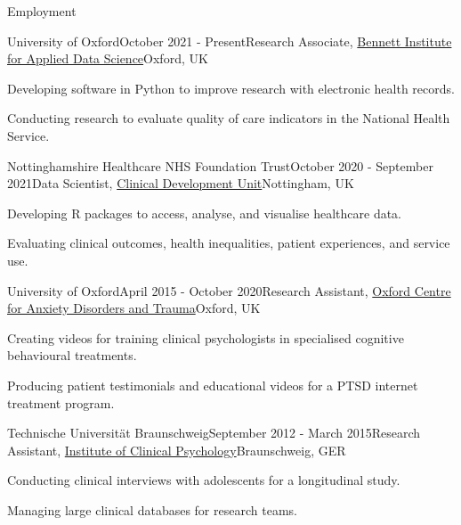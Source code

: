 \documentclass{resume} %
\begin{document}

\begin{rSection}{Employment}

\begin{rSubsection}{University of Oxford}{October 2021 - Present}{Research Associate, \href{https://www.bennett.ox.ac.uk/}{Bennett Institute for Applied Data Science}}{Oxford, UK}
  \item Developing software in Python to improve research with electronic health records.
  \item Conducting research to evaluate quality of care indicators in the National Health Service.
\end{rSubsection}

\begin{rSubsection}{Nottinghamshire Healthcare NHS Foundation Trust}{October 2020 - September 2021}{Data Scientist, \href{https://www.nottinghamshirehealthcare.nhs.uk/}{Clinical Development Unit}}{Nottingham, UK}
  \item Developing R packages to access, analyse, and visualise healthcare data.
  \item Evaluating clinical outcomes, health inequalities, patient experiences, and service use.
\end{rSubsection}

\begin{rSubsection}{University of Oxford}{April 2015 - October 2020}{Research Assistant, \href{https://www.psy.ox.ac.uk/research/oxford-centre-for-anxiety-disorders-and-trauma}{Oxford Centre for Anxiety Disorders and Trauma}}{Oxford, UK}
  \item Creating videos for training clinical psychologists in specialised cognitive behavioural treatments.
  \item Producing patient testimonials and educational videos for a PTSD internet treatment program.
\end{rSubsection}

\begin{rSubsection}{Technische Universit{\"a}t Braunschweig}{September 2012 - March 2015}{Research Assistant, \href{https://www.tu-braunschweig.de/psychologie/klinische}{Institute of Clinical Psychology}}{Braunschweig, GER}
  \item Conducting clinical interviews with adolescents for a longitudinal study.
  \item Managing large clinical databases for research teams.
\end{rSubsection}

\end{rSection}
\end{document}
